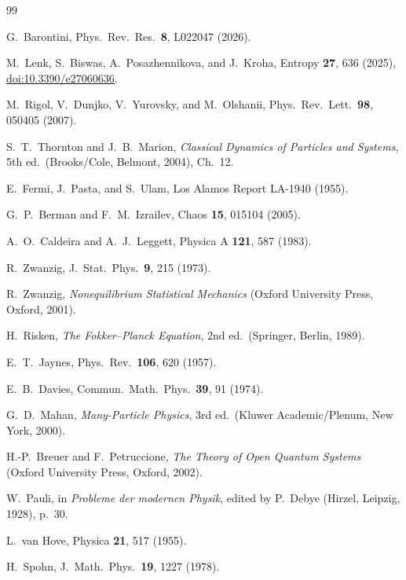 \documentclass[10pt,a4paper]{article}
\renewcommand{\small}{\fontsize{12pt}{14.5pt}\selectfont}
\begin{document}
\begin{thebibliography}{99}
\small

G.~Barontini, Phys.\ Rev.\ Res.\ \textbf{8}, L022047 (2026).

M.~Lenk, S.~Biswas, A.~Posazhennikova, and J.~Kroha, Entropy \textbf{27}, 636 (2025), \href{https://doi.org/10.3390/e27060636}{doi:10.3390/e27060636}.

M.~Rigol, V.~Dunjko, V.~Yurovsky, and M.~Olshanii, Phys.\ Rev.\ Lett.\ \textbf{98}, 050405 (2007).

S.~T.~Thornton and J.~B.~Marion, \textit{Classical Dynamics of Particles and Systems}, 5th ed.\ (Brooks/Cole, Belmont, 2004), Ch.~12.

E.~Fermi, J.~Pasta, and S.~Ulam, Los Alamos Report LA-1940 (1955).

G.~P.~Berman and F.~M.~Izrailev, Chaos \textbf{15}, 015104 (2005).

A.~O.~Caldeira and A.~J.~Leggett, Physica A \textbf{121}, 587 (1983).

R.~Zwanzig, J.~Stat.\ Phys.\ \textbf{9}, 215 (1973).

R.~Zwanzig, \textit{Nonequilibrium Statistical Mechanics} (Oxford University Press, Oxford, 2001).

H.~Risken, \textit{The Fokker--Planck Equation}, 2nd ed.\ (Springer, Berlin, 1989).

E.~T.~Jaynes, Phys.\ Rev.\ \textbf{106}, 620 (1957).

E.~B.~Davies, Commun.\ Math.\ Phys.\ \textbf{39}, 91 (1974).

G.~D.~Mahan, \textit{Many-Particle Physics}, 3rd ed.\ (Kluwer Academic/Plenum, New York, 2000).

H.-P.~Breuer and F.~Petruccione, \textit{The Theory of Open Quantum Systems} (Oxford University Press, Oxford, 2002).

W.~Pauli, in \textit{Probleme der modernen Physik}, edited by P.~Debye (Hirzel, Leipzig, 1928), p.~30.

L.~van Hove, Physica \textbf{21}, 517 (1955).

H.~Spohn, J.~Math.\ Phys.\ \textbf{19}, 1227 (1978).


\end{thebibliography}
\end{document}
